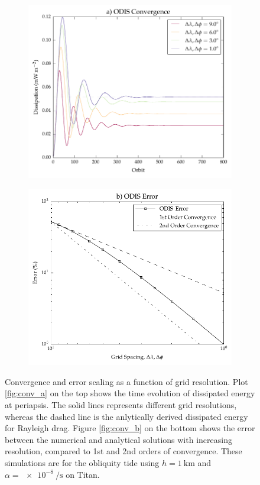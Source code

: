 \begin{figure}[!t]\centering
\begin{subfigure}{0.5\linewidth}
\centering
\includegraphics[width=0.95\linewidth]{Figures/res_test}
\subcaption{\label{fig:conv_a}}
\end{subfigure}%
\begin{subfigure}{0.5\linewidth}
\centering
\includegraphics[width=0.95\linewidth]{Figures/error}
\subcaption{\label{fig:conv_b}}
\end{subfigure}\vspace*{-0.7cm}
\caption{Convergence and error scaling as a function of grid resolution. Plot \ref{fig:conv_a} on the top shows the time evolution of dissipated energy at periapsis. The solid lines represents different grid resolutions, whereas the dashed line is the anlytically derived dissipated energy for Rayleigh drag. Figure \ref{fig:conv_b} on the bottom shows the error between the numerical and analytical solutions with increasing resolution, compared to 1st and 2nd orders of convergence. These simulations are for the obliquity tide using $h = \SI{1}{\kilo\metre}$ and $\alpha = \SI{e-8}{\per\second}$ on Titan. \label{fig:conv}}
\end{figure}

